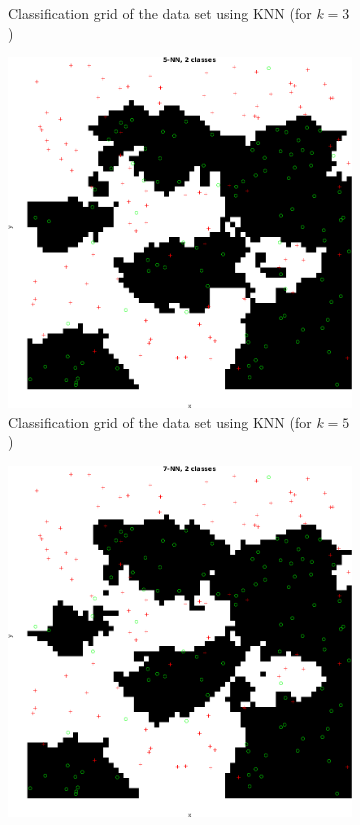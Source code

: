 \documentclass[10pt]{article}
\begin{document}
\begin{figure}[H]
\begin{subfigure}{.49\textwidth}
    \caption{Classification grid of the data set using KNN (for $k=3$)}
    \label{fig2.1b}
  \end{subfigure}
  \begin{subfigure}{.49\textwidth}
    \includegraphics[width=1\textwidth]{assign2_2_5.png}
    \caption{Classification grid of the data set using KNN (for $k=5$)}
    \label{fig2.1c}
  \end{subfigure}
  \begin{subfigure}{.49\textwidth}
    \includegraphics[width=1\textwidth]{assign2_2_7.png}

\end{subfigure}
\end{figure}
\end{document}
